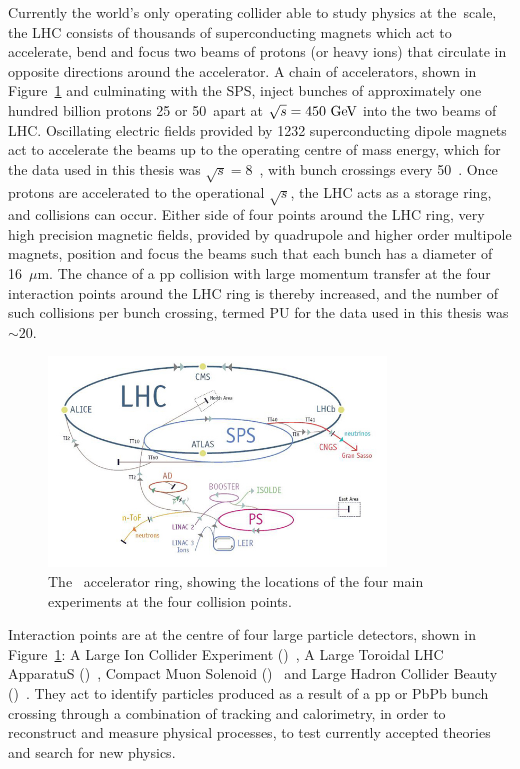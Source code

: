 Currently the world's only operating collider able to study physics at the~\TeV scale, the \ac{LHC} consists of thousands of superconducting magnets which act to accelerate, bend and focus two beams of protons (or heavy ions) that circulate in opposite directions around the accelerator. 
A chain of accelerators, shown in Figure~\ref{fig:LHC} and culminating with the \ac{SPS}, inject bunches of approximately one hundred billion protons 25 or 50~\ns apart at $\sqrt{s} = 450~\mathrm{GeV}$ into the two beams of \ac{LHC}.
Oscillating electric fields provided by 1232 superconducting dipole magnets act to accelerate the beams up to the operating centre of mass energy, which for the data used in this thesis was $\sqrt{s} = 8$~\TeV, with bunch crossings every 50~\ns.
Once protons are accelerated to the operational $\sqrt{s}$, the \ac{LHC} acts as a storage ring, and collisions can occur.
%
Either side of four points around the \ac{LHC} ring, very high precision magnetic fields, provided by quadrupole and higher order multipole magnets, position and focus the beams such that each bunch has a diameter of 16~$\mu$m. 
The chance of a pp collision with large momentum transfer at the four interaction points around the LHC ring is thereby increased, and the number of such collisions per bunch crossing, termed \ac{PU} for the data used in this thesis was $\sim20$.

\begin{figure}[htbp]
  \begin{center}
  \includegraphics[width=0.8\textwidth]{Figures/detector/lhc}
  \caption{The ~\LHC accelerator ring, showing the locations of the four main experiments at the four collision points.
}
  \label{fig:LHC}
  \end{center}
\end{figure}

Interaction points are at the centre of four large particle detectors, shown in Figure~\ref{fig:LHC}:
A Large Ion Collider Experiment (\ALICE)~\cite{Aamodt:2008zz}, 
A Large Toroidal LHC ApparatuS (\ATLAS)~\cite{Aad:2008zzm}, 
Compact Muon Solenoid (\CMS)~\cite{Chatrchyan:2008aa} and 
Large Hadron Collider Beauty (\LHCb)~\cite{Alves:2008zz}.
They act to identify particles produced as a result of a pp or PbPb bunch crossing through a combination of tracking and calorimetry, in order to reconstruct and measure physical processes, to test currently accepted theories and search for new physics.

